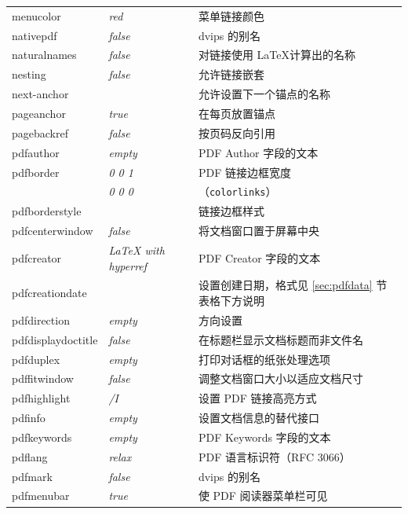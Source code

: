 \documentclass{article}
\begin{document}
\begin{longtable}{@{}>{\ttfamily}llp{7cm}@{}}
menucolor          & \textit{red}           & 菜单链接颜色\\
nativepdf          & \textit{false}         & \textsf{dvips} 的别名\\
naturalnames       & \textit{false}         & 对链接使用 \LaTeX 计算出的名称\\
nesting            & \textit{false}         & 允许链接嵌套\\
next-anchor        &                        & 允许设置下一个锚点的名称\\
pageanchor         & \textit{true}          & 在每页放置锚点\\
pagebackref        & \textit{false}         & 按页码反向引用\\
pdfauthor          & \textit{empty}         & PDF Author 字段的文本\\
pdfborder          & \textit{0 0 1}         & PDF 链接边框宽度\\
                   & \textit{0 0 0}         & （\texttt{colorlinks}）\\
pdfborderstyle     &                        & 链接边框样式\\
pdfcenterwindow    & \textit{false}         & 将文档窗口置于屏幕中央\\
pdfcreator         & \textit{LaTeX with hyperref} & PDF Creator 字段的文本\\
pdfcreationdate    &                        & 设置创建日期，格式见 \ref{sec:pdfdata} 节表格下方说明\\
pdfdirection       & \textit{empty}         & 方向设置\\
pdfdisplaydoctitle & \textit{false}         & 在标题栏显示文档标题而非文件名\\
pdfduplex          & \textit{empty}         & 打印对话框的纸张处理选项\\
pdffitwindow       & \textit{false}         & 调整文档窗口大小以适应文档尺寸\\
pdfhighlight       & \textit{/I}            & 设置 PDF 链接高亮方式\\
pdfinfo            & \textit{empty}         & 设置文档信息的替代接口\\
pdfkeywords        & \textit{empty}         & PDF Keywords 字段的文本\\
pdflang            & \textit{relax}         & PDF 语言标识符（RFC 3066）\\
pdfmark            & \textit{false}         & \textsf{dvips} 的别名\\
pdfmenubar         & \textit{true}          & 使 PDF 阅读器菜单栏可见\\

\end{longtable}
\end{document}
